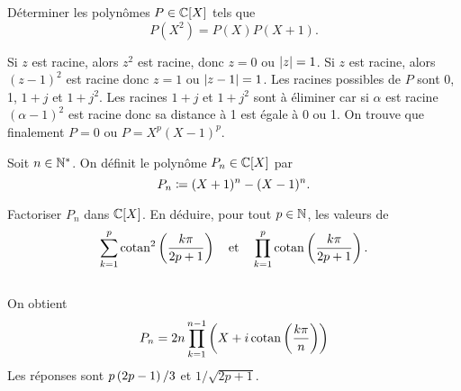 \documentclass{magnolia}
\begin{document}
Déterminer les polynômes $P\in\polyC$ tels que
\[P(X^2)=P(X)P(X+1).\]
\begin{sol}
Si $z$ est racine, alors $z^2$ est racine, donc $z=0$ ou $\left|z\right|=1$. Si
$z$ est racine, alors $(z-1)^2$ est racine donc $z=1$ ou $\left|z-1\right|=1$.
Les racines possibles de $P$ sont 0, 1, $1+j$ et $1+j^2$. Les racines
$1+j$ et $1+j^2$ sont à éliminer car si $\alpha$ est racine $(\alpha-1)^2$
est racine donc sa distance à 1 est égale à 0 ou 1. On trouve que finalement
$P=0$ ou $P=X^p(X-1)^p$.
\end{sol}



Soit $n\in{\mathbb{N}^*}$. On définit le polynôme $P_n\in\polyC$ par
\[P_n\coloneqq (X+1)^{n}-(X-1)^{n}.\]
\begin{questions}
\question Factoriser $P_n$ dans $\polyC$.
\question En déduire, pour tout $p\in\mathbb{N}$, les valeurs de
  \[\sum_{k=1}^p \operatorname{cotan}^2\left(\frac{k\pi}{2p+1}\right)
    \quad \text{et}
    \quad \prod_{k=1}^p \operatorname{cotan}\left(\frac{k\pi}{2p+1}\right).\]
\end{questions}
\begin{sol}
$\quad$
\begin{questions}
\question On obtient
  \[P_n=2n\prod_{k=1}^{n-1} \left(X+i\operatorname{cotan}\left(\frac{k\pi}{n}\right)\right)\]
\question Les réponses sont $p\left(2p-1\right)/3$ et $1/\sqrt{2p+1}$.
\end{questions}
\end{sol}



\end{document}
